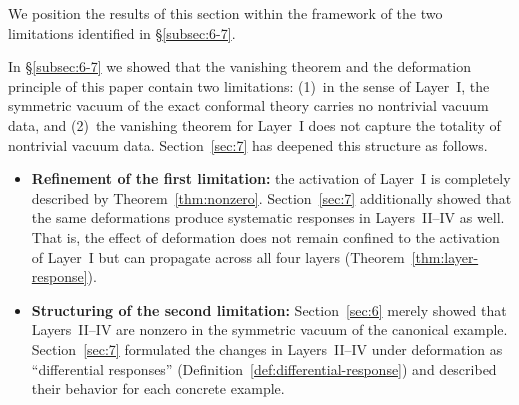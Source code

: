 \documentclass[
  aps,
  prd,
  preprint,
  groupedaddress,
  nofootinbib,
  longbibliography
]{revtex4-2}
\theoremstyle{remark}
\begin{document}
We position the results of this section within the framework of
the two limitations identified in \S\ref{subsec:6-7}.

In \S\ref{subsec:6-7} we showed that the vanishing theorem and
the deformation principle of this paper contain two limitations:
(1)~in the sense of Layer~I, the symmetric vacuum of the exact
conformal theory carries no nontrivial vacuum data, and
(2)~the vanishing theorem for Layer~I does not capture the
totality of nontrivial vacuum data.
Section~\ref{sec:7} has deepened this structure as follows.

\begin{itemize}
\item \textbf{Refinement of the first limitation:}
  the activation of Layer~I is completely described by
  Theorem~\ref{thm:nonzero}.
  Section~\ref{sec:7} additionally showed that the same
  deformations produce systematic responses in Layers~II--IV as
  well.
  That is, the effect of deformation does not remain confined
  to the activation of Layer~I but can propagate across all four
  layers (Theorem~\ref{thm:layer-response}).

\item \textbf{Structuring of the second limitation:}
  Section~\ref{sec:6} merely showed that Layers~II--IV are
  nonzero in the symmetric vacuum of the canonical example.
  Section~\ref{sec:7} formulated the changes in Layers~II--IV
  under deformation as ``differential responses''
  (Definition~\ref{def:differential-response}) and described
  their behavior for each concrete example.
\end{itemize}
\end{document}
